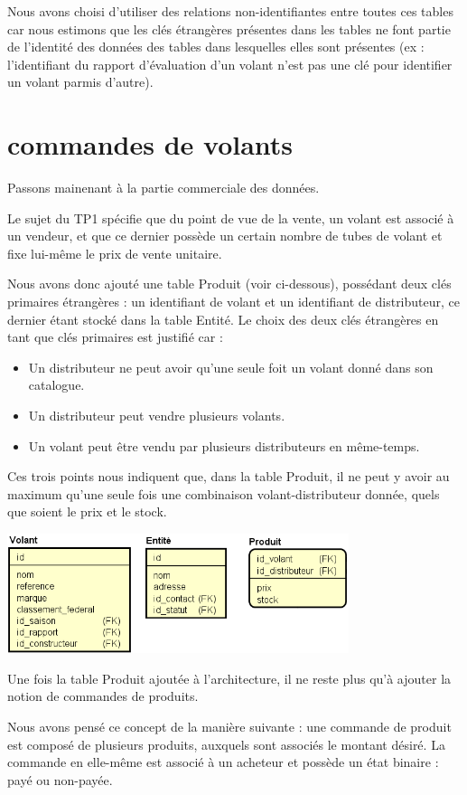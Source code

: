 \documentclass[french,a4paper,12pt]{report}
\begin{document}
Nous avons choisi d'utiliser des relations non-identifiantes entre toutes ces
tables car nous estimons que les clés étrangères présentes dans les tables ne
font partie de l'identité des données des tables dans lesquelles elles sont
présentes (ex : l'identifiant du rapport d'évaluation d'un volant n'est pas
une clé pour identifier un volant parmis d'autre).

\section{commandes de volants}
Passons mainenant à la partie commerciale des données.

Le sujet du TP1 spécifie que du point de vue de la vente, un volant est associé
à un vendeur, et que ce dernier possède un certain nombre de tubes de volant et
fixe lui-même le prix de vente unitaire.

Nous avons donc ajouté une table Produit (voir ci-dessous), possédant deux clés
primaires étrangères : un identifiant de volant et un identifiant de
distributeur, ce dernier étant stocké dans la table Entité. Le choix des deux
clés étrangères en tant que clés primaires est justifié car :
\begin{itemize}
  \item Un distributeur ne peut avoir qu'une seule foit un volant donné dans
  son catalogue.
  \item Un distributeur peut vendre plusieurs volants.
  \item Un volant peut être vendu par plusieurs distributeurs en même-temps.
\end{itemize}
Ces trois points nous indiquent que, dans la table Produit, il ne peut y avoir
au maximum qu'une seule fois une combinaison volant-distributeur donnée, quels
que soient le prix et le stock.

\includegraphics[width=10cm]{ensemble2.png}

Une fois la table Produit ajoutée à l'architecture, il ne reste plus qu'à
ajouter la notion de commandes de produits.

Nous avons pensé ce concept de la manière suivante : une commande de produit
est composé de plusieurs produits, auxquels sont associés le montant désiré.
La commande en elle-même est associé à un acheteur et possède un état binaire :
payé ou non-payée.
\end{document}
